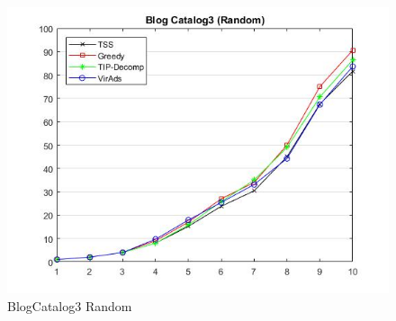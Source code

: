 \begin{figure}
	\centering	
	\includegraphics[scale=0.5]{images/bc3resultrandom.jpg}
	\caption{BlogCatalog3 Random}
\end{figure}

